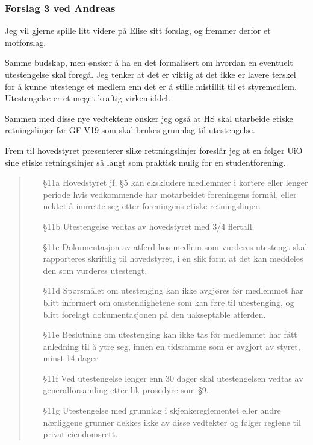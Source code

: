 \documentclass[10pt,norsk,a4paper]{article}
\begin{document}
\subsubsection{Forslag 3 ved Andreas}
Jeg vil gjerne spille litt videre på Elise sitt forslag, og fremmer derfor et motforslag.

Samme budskap, men ønsker å ha en det formalisert om hvordan en eventuelt utestengelse skal foregå.
Jeg tenker at det er viktig at det ikke er lavere terskel for å kunne utestenge et medlem enn det er å stille mistillit til et styremedlem.
Utestengelse er et meget kraftig virkemiddel.

Sammen med disse nye vedtektene ønsker jeg også at HS skal utarbeide etiske retningslinjer før GF V19 som skal brukes grunnlag til utestengelse.

Frem til hovedstyret presenterer slike rettningslinjer foreslår jeg at en følger UiO sine etiske retningslinjer så langt som praktisk mulig for en studentforening.

\begin{quote}
    \begin{enumerate}
        \item[§11a] Hovedstyret jf. §5 kan ekskludere medlemmer i kortere eller lenger periode hvis vedkommende har motarbeidet foreningens formål, eller nektet å innrette seg etter foreningens etiske retningslinjer.
        \item[§11b] Utestengelse vedtas av hovedstyret med 3/4 flertall.
        \item[§11c] Dokumentasjon av atferd hos medlem som vurderes utestengt skal rapporteres skriftlig til hovedstyret, i en slik form at det kan meddeles den som vurderes utestengt.
        \item[§11d] Spørsmålet om utestenging kan ikke avgjøres før medlemmet har blitt informert om omstendighetene som kan føre til utestenging, og blitt forelagt dokumentasjonen på den uakseptable atferden.
        \item[§11e] Beslutning om utestenging kan ikke tas før medlemmet har fått anledning til å ytre seg, innen en tidsramme som er avgjort av styret, minst 14 dager.
        \item[§11f] Ved utestengelse lenger enn 30 dager skal utestengelsen vedtas av generalforsamling etter lik prosedyre som §9.
        \item[§11g] Utestengelse med grunnlag i skjenkereglementet eller andre nærliggene grunner dekkes ikke av disse vedtekter og følger reglene til privat eiendomsrett.
    \end{enumerate}
\end{quote}
\end{document}
